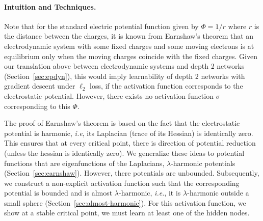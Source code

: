 \paragraph{Intuition and Techniques.}
%
Note that for the standard electric potential function given by $\Phi = 1/r$ where $r$ is the distance between the charges, it is known from Earnshaw's theorem that an electrodynamic system with some fixed charges and some moving electrons is at equilibrium only when the moving charges coincide with the fixed charges. Given our translation above between electrodynamic systems and depth 2 networks (Section~\ref{sec:epdyn}), this would imply learnability of depth 2 networks with gradient descent under $\ell_2$ loss, if the activation function corresponds to the electrostatic potential. However, there exists no activation function $\sigma$ corresponding to this $\Phi$. 
%


The proof of Earnshaw's theorem is based on the fact that the electrostatic potential is harmonic, \emph{i.e}, its Laplacian (trace of its Hessian) is identically zero. This ensures that at every critical point, there is direction of potential reduction (unless the hessian is identically zero). We generalize these ideas to potential functions that are eigenfunctions of the Laplacians, $\lambda$-harmonic potentials (Section~\ref{sec:earnshaw}). However, there potentials are unbounded. Subsequently, we construct a non-explicit activation function such that the corresponding potential is bounded and is almost $\lambda$-harmonic, \emph{i.e.}, it is $\lambda$-harmonic outside a small sphere (Section~\ref{sec:almost-harmonic}). For this activation function, we show at a stable critical point, we must learn at least one of the hidden nodes. 

